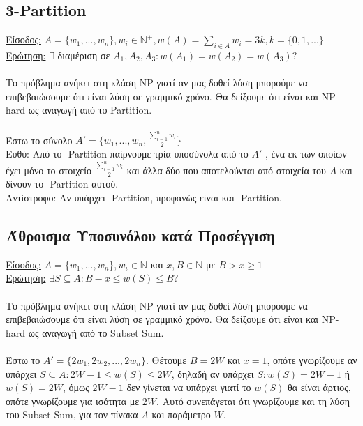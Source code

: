 \documentclass[12pt,a4paper]{article}
\begin{document}
  \subsection{3-{\latintext Partition}}

    \underline{Είσοδος:} \(A=\{w_1, ..., w_n\}, w_i \in \mathbb{N}^{+}, w(A) 
    = \sum_{i \in
    A}{w_i} = 3k, k=\{0, 1, ...\}\)
    \\
    \underline{Ερώτηση:} \(\exists\) διαμέριση σε \(Α_1, Α_2, Α_3 : w(A_1)=
    w(A_2)=w(A_3)\)?
    \\
    \\
    Το πρόβλημα ανήκει στη κλάση {\latintext NP} γιατί αν μας δοθεί λύση
    μπορούμε να
    επιβεβαιώσουμε ότι είναι λύση σε γραμμικό χρόνο. Θα δείξουμε ότι είναι και
    {\latintext NP-hard} ως αναγωγή από το {\latintext Partition}.
    \\
    \\
    Έστω το σύνολο \(Α' = \{w_1, ..., w_n, \frac{\sum_{i=1}^{n}{w_i}}{2}\}\)
    \\
    Ευθύ: Από το {-Partition} παίρνουμε τρία υποσύνολα από το \(A'\)
    , ένα εκ των οποίων έχει μόνο το
    στοιχείο \(\frac{\sum_{i=1}^{n}{w_i}}{2}\) και
    άλλα δύο που αποτελούνται από στοιχεία του \(Α\) και δίνουν το
    {-Partition} αυτού.
    \\
    Αντίστροφο: Αν υπάρχει {-Partition}, προφανώς είναι και
    {-Partition}.

  \subsection{Άθροισμα Υποσυνόλου κατά Προσέγγιση}%

    \underline{Είσοδος:} \(A=\{w_1, ..., w_n\}, w_i \in \mathbb{N}\) και
    \(x, B \in \mathbb{N}\) με \(B > x \ge 1\)
    \\
    \underline{Ερώτηση:} \(\exists S \subseteq A : B - x \le w(S) \le B\)?
    \\
    \\
    Το πρόβλημα ανήκει στη κλάση {\latintext NP} γιατί αν μας δοθεί λύση
    μπορούμε να
    επιβεβαιώσουμε ότι είναι λύση σε γραμμικό χρόνο. Θα δείξουμε ότι είναι και
    {\latintext NP-hard} ως αναγωγή από το {\latintext Subset Sum}.
    \\
    \\
    Έστω το \(A'=\{2w_1, 2w_2, ..., 2w_n\}\). Θέτουμε \(Β = 2W\) και
    \(x = 1\), οπότε γνωρίζουμε αν υπάρχει \(S \subseteq A: 2W -1 \le w(S) \le 
    2W\), δηλαδή αν υπάρχει \(S: w(S) = 2W -1\) ή \(w(S) = 2W\), όμως \(2W-1\)
    δεν γίνεται να υπάρχει γιατί το \(w(S)\) θα είναι άρτιος, οπότε γνωρίζουμε
    για ισότητα με \(2W\). Αυτό συνεπάγεται ότι γνωρίζουμε και τη λύση του
    {\latintext Subset Sum}, για τον πίνακα \(Α\) και παράμετρο \(W\).
\end{document}
